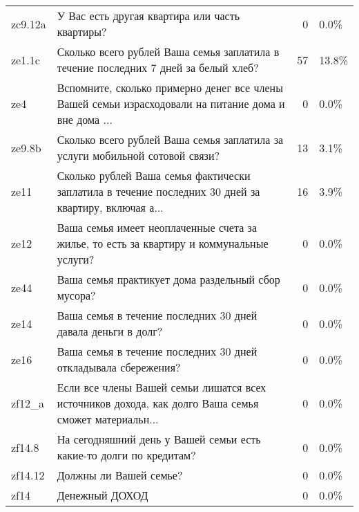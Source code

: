 \begin{longtable}{llrl}
 zc9.12a &                                                       У Вас есть другая квартира или часть квартиры? &                                0 &                      0.0\% \\
  ze1.1c &                  Сколько всего рублей Ваша семья заплатила в течение последних 7 дней за белый хлеб? &                               57 &                     13.8\% \\
     ze4 & Вспомните, сколько примерно денег все члены Вашей семьи израсходовали на питание дома и вне дома ... &                                0 &                      0.0\% \\
  ze9.8b &                        Сколько всего рублей Ваша семья заплатила за услуги мобильной сотовой связи?  &                               13 &                      3.1\% \\
    ze11 & Сколько рублей Ваша семья фактически заплатила в течение последних 30 дней за квартиру, включая а... &                               16 &                      3.9\% \\
    ze12 &             Ваша семья имеет неоплаченные счета за жилье, то есть за квартиру и коммунальные услуги? &                                0 &                      0.0\% \\
    ze44 &                                                   Ваша семья практикует дома раздельный сбор мусора? &                                0 &                      0.0\% \\
    ze14 &                                         Ваша семья в течение последних 30 дней давала деньги в долг? &                                0 &                      0.0\% \\
    ze16 &                                       Ваша семья в течение последних 30 дней откладывала сбережения? &                                0 &                      0.0\% \\
  zf12\_a & Если все члены Вашей семьи лишатся всех источников дохода, как долго Ваша семья сможет материальн... &                                0 &                      0.0\% \\
  zf14.8 &                                   На сегодняшний день у Вашей семьи есть какие-то долги по кредитам? &                                0 &                      0.0\% \\
 zf14.12 &                                                                               Должны ли Вашей семье? &                                0 &                      0.0\% \\
    zf14 &                                                                                       Денежный ДОХОД &                                0 &                      0.0\% \\
\end{longtable}
